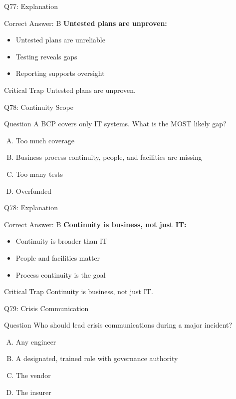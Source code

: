\documentclass{beamer}
\begin{document}
	\begin{frame}{Q77: Explanation}
		\begin{block}{Correct Answer: B}
			\textbf{Untested plans are unproven:}
			\begin{itemize}
				\item Untested plans are unreliable
				\item Testing reveals gaps
				\item Reporting supports oversight
			\end{itemize}
		\end{block}
		\begin{alertblock}{Critical Trap}
			Untested plans are unproven.
		\end{alertblock}
	\end{frame}
	
	\begin{frame}{Q78: Continuity Scope}
		\begin{block}{Question}
			A BCP covers only IT systems. What is the MOST likely gap?
		\end{block}
		\begin{enumerate}[(A)]
			\item Too much coverage
			\item Business process continuity, people, and facilities are missing
			\item Too many tests
			\item Overfunded
		\end{enumerate}
	\end{frame}
	
	\begin{frame}{Q78: Explanation}
		\begin{block}{Correct Answer: B}
			\textbf{Continuity is business, not just IT:}
			\begin{itemize}
				\item Continuity is broader than IT
				\item People and facilities matter
				\item Process continuity is the goal
			\end{itemize}
		\end{block}
		\begin{alertblock}{Critical Trap}
			Continuity is business, not just IT.
		\end{alertblock}
	\end{frame}
	
	\begin{frame}{Q79: Crisis Communication}
		\begin{block}{Question}
			Who should lead crisis communications during a major incident?
		\end{block}
		\begin{enumerate}[(A)]
			\item Any engineer
			\item A designated, trained role with governance authority
			\item The vendor
			\item The insurer
		\end{enumerate}
	\end{frame}
	
\end{document}
